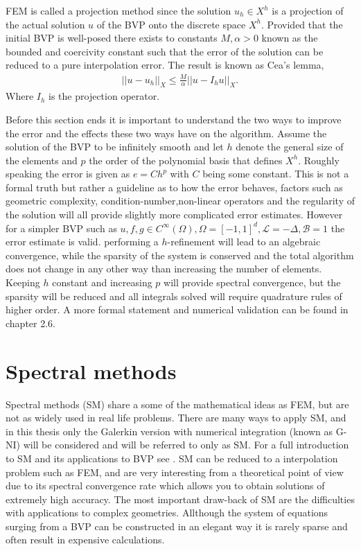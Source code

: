 FEM is called a projection method since the solution $u_h\in X^h$ is a projection
of the actual solution $u$ of the BVP onto the discrete space $X^h$. Provided that the initial BVP is well-posed there exists to 
constants $M,\alpha>0$ known as the bounded and coercivity constant such that the error of the solution can be reduced to a pure 
interpolation error. The result is known as Cea's lemma,  
\begin{align}
    ||u-u_h||_X \leq \frac{M}{\alpha}||u-I_hu||_X.
    \label{eq:Cea}
\end{align}
Where $I_h$ is the projection operator. 

Before this section ends it is important to understand the two ways to improve the error and the effects these two ways have on the algorithm. 
Assume the solution of the BVP to be infinitely smooth and let $h$ denote the general size of the elements
and $p$ the order of the polynomial basis that defines $X^h$. Roughly speaking the error is given as $e = Ch^p$ with $C$ being some constant.
This is not a formal truth but rather a guideline as to how the error behaves, factors such as geometric complexity, condition-number,non-linear
operators and the regularity of the solution will all provide slightly more complicated error estimates. 
However for a simpler BVP such as $u,f,g \in C^{\infty}(\Omega), \Omega = [-1,1]^d, \mathcal{L} = -\Delta,\mathcal{B} = 1$ the error estimate is valid.  
performing a $h$-refinement will lead to an algebraic convergence, while the sparsity of the system is conserved
and the total algorithm does not change in any other way than increasing the number of elements.
Keeping $h$ constant and increasing $p$ will provide spectral convergence, but the sparsity will be reduced and all integrals solved will require 
quadrature rules of higher order. A more formal statement and numerical validation can be found in \cite{Karniadakis} chapter 2.6.  

\section{Spectral methods}
Spectral methods (SM) share a some of the mathematical ideas as FEM, but are not as widely used in real life problems. 
There are many ways to apply SM, 
and in this thesis only the Galerkin version with numerical integration (known as G-NI) will be considered and will be referred to only as SM. 
For a full introduction to SM and its applications to BVP see \cite{Canuto}.
SM can be reduced to a interpolation problem such as FEM, and are very interesting from a theoretical point of view due to its 
spectral convergence rate which allows you to obtain solutions of extremely high accuracy. 
The most important draw-back of SM are the difficulties with applications to complex geometries. Allthough the system of equations surging from
a BVP can be constructed in an elegant way it is rarely sparse and often result in expensive calculations. 

